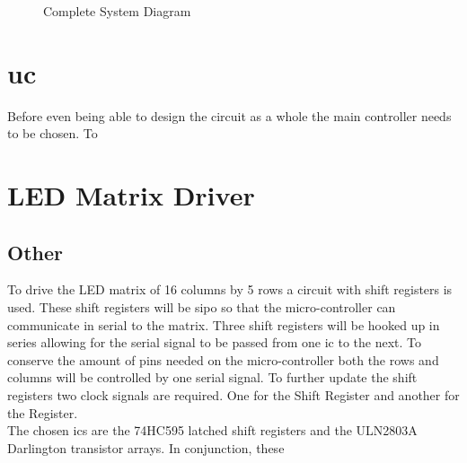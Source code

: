 \documentclass[12pt,a4paper]{report}
\begin{document}
\begin{figure}

\caption{Complete System Diagram}
\end{figure}


\section{\ac{uc}}
Before even being able to design the circuit as a whole the main controller needs to be chosen. To 
\section{LED Matrix Driver}

\subsection{Other}
To drive the LED matrix of 16 columns by 5 rows a circuit with shift registers is used. These shift registers will be \ac{sipo} so that the micro-controller can communicate in serial to the matrix. Three shift registers will be hooked up in series allowing for the serial signal to be passed from one \ac{ic} to the next. To conserve the amount of pins needed on the micro-controller both the rows and columns will be controlled by one serial signal. To further update the shift registers two clock signals are required. One for the Shift Register and another for the Register. \\
The chosen \acp{ic} are the 74HC595 latched shift registers and the ULN2803A Darlington transistor arrays. In conjunction, these 
\end{document}
